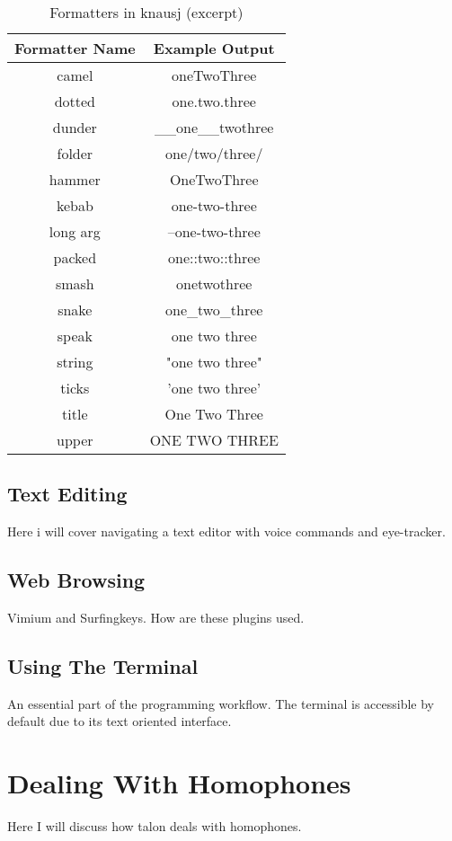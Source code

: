 \documentclass[../thesis.tex]{subfiles}
\begin{document}
\begin{table}[htpb]
   \centering
   \caption{Formatters in knausj (excerpt)}
   \label{tab:formatters}
   \begin{tabular}{|c|c|}
      \toprule
      Formatter Name & Example Output \\
      \midrule
      camel & oneTwoThree  \\
      dotted & one.two.three  \\
      dunder & \_\_one\_\_twothree  \\
      folder & one/two/three/  \\
      hammer & OneTwoThree  \\
      kebab & one-two-three  \\
      long arg & --one-two-three  \\
      packed & one::two::three  \\
      smash & onetwothree  \\
      snake & one\_two\_three  \\
      speak & one two three  \\
      string & "one two three"  \\
      ticks & 'one two three'  \\
      title & One Two Three  \\
      upper & ONE TWO THREE  \\
      \bottomrule
   \end{tabular}
\end{table}

\subsection{Text Editing}
Here i will cover navigating a text editor with voice commands and eye-tracker.

\subsection{Web Browsing}
Vimium and Surfingkeys. How are these plugins used.

\subsection{Using The Terminal}
An essential part of the programming workflow. The terminal is accessible by default due to its text oriented interface.

\section{Dealing With Homophones}\label{dealing_with_homophones}
Here I will discuss how talon deals with homophones.
\end{document}
